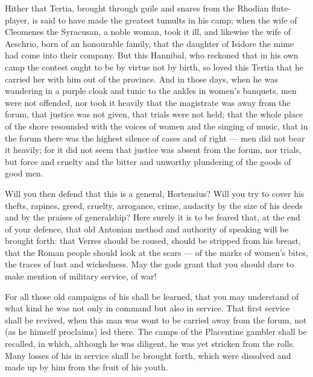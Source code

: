  Hither that Tertia, brought through guile and snares from the Rhodian flute-player, is said to have made the greatest tumults in his camp; when the wife of Cleomenes the Syracusan, a noble woman, took it ill, and likewise the wife of Aeschrio, born of an honourable family, that the daughter of Isidore the mime had come into their company. But this Hannibal, who reckoned that in his own camp the contest ought to be by virtue not by birth, so loved this Tertia that he carried her with him out of the province. And in those days, when he was wandering in a purple cloak and tunic to the ankles in women's banquets, men were not offended, nor took it heavily that the magistrate was away from the forum, that justice was not given, that trials were not held; that the whole place of the shore resounded with the voices of women and the singing of music, that in the forum there was the highest silence of cases and of right --- men did not bear it heavily; for it did not seem that justice was absent from the forum, nor trials, but force and cruelty and the bitter and unworthy plundering of the goods of good men.

 Will you then defend that this is a general, Hortensius? Will you try to cover his thefts, rapines, greed, cruelty, arrogance, crime, audacity by the size of his deeds and by the praises of generalship? Here surely it is to be feared that, at the end of your defence, that old Antonian method and authority of speaking will be brought forth: that Verres should be roused, should be stripped from his breast, that the Roman people should look at the scars --- of the marks of women's bites, the traces of lust and wickedness. May the gods grant that you should dare to make mention of military service, of war!

 For all those old campaigns of his shall be learned, that you may understand of what kind he was not only in command but also in service. That first service shall be revived, when this man was wont to be carried away from the forum, not (as he himself proclaims) led there. The camps of the Placentine gambler shall be recalled, in which, although he was diligent, he was yet stricken from the rolls. Many losses of his in service shall be brought forth, which were dissolved and made up by him from the fruit of his youth.

